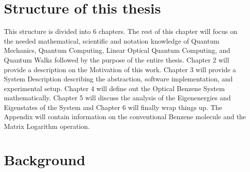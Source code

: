 \indent 

\section{Structure of this thesis}
\label{sec:history}
\indent This structure is divided into $6$ chapters. The rest of this chapter will focus on the needed mathematical, scientific and notation knowledge of Quantum Mechanics, Quantum Computing, Linear Optical Quantum Computing, and Quantum Walks followed by the purpose of the entire thesis. Chapter 2 will provide a description on the Motivation of this work. Chapter 3 will provide a System Description describing the abstraction, software implementation, and experimental setup. Chapter 4 will define out the Optical Benzene System mathematically. Chapter 5 will discuss the analysis of the Eigenenergies and Eigenstates of the System and Chapter 6 will finally wrap things up. The Appendix will contain information on the conventional Benzene molecule and the Matrix Logarithm operation.



\section{Background}
\label{sec:history}

